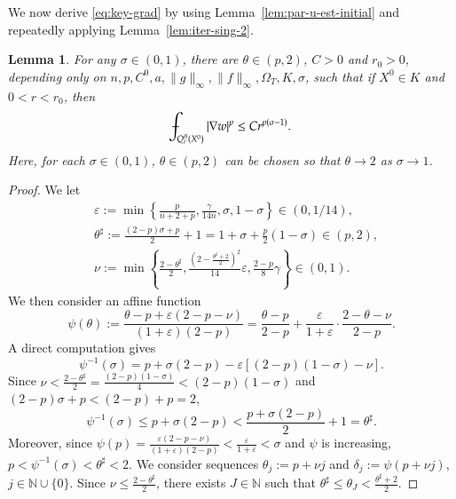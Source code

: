 \documentclass[11pt,oneside,english]{amsart}
\newcommand{\e}{\varepsilon}
\newcommand{\de}{\delta}
\newcommand{\D}{\nabla}
\numberwithin{equation}{section}
\def\Xint#1{\mathchoice
  {\XXint\displaystyle\textstyle{#1}}%
  {\XXint\textstyle\scriptstyle{#1}}%
  {\XXint\scriptstyle\scriptscriptstyle{#1}}%
  {\XXint\scriptscriptstyle\scriptscriptstyle{#1}}%
  \!\int}
\def\XXint#1#2#3{{\setbox0=\hbox{$#1{#2#3}{\int}$}
    \vcenter{\hbox{$#2#3$}}\kern-.5\wd0}}
\def\dashint{\Xint-}
\theoremstyle{plain}
\newtheorem{lemma}{Lemma}
\numberwithin{equation}{section}
\begin{document}
We now derive \eqref{eq:key-grad} by using Lemma~\ref{lem:par-u-est-initial} and repeatedly applying Lemma~\ref{lem:iter-sing-2}.

\begin{lemma}\label{lem:par-u-v-est}
    For any $\sigma\in (0,1)$, there are $\theta\in(p,2)$, $C>0$ and $r_0>0$, depending only on $n,p,C^0,a,\|g\|_\infty,\|f\|_\infty, \Omega_T,K, \sigma$, such that if $X^0\in K$ and $0<r<r_0$, then
    \begin{align*}
        \dashint_{Q_r^\theta(X^0)}|\D w|^p\le Cr^{p(\sigma-1)}.
    \end{align*}
    Here, for each $\sigma\in(0,1)$, $\theta\in(p,2)$ can be chosen so that $\theta\to2$ as $\sigma\to1$.
\end{lemma}

\begin{proof}
We let
\begin{align*}
&\e:=\min\left\{\frac{p}{n+2+p}, \frac{\gamma}{14n},\sigma, 1-\sigma\right\}\in(0,1/14),\\
&\theta^\sharp:=\frac{(2-p)\sigma+p}2+1=1+\sigma+\frac{p}2(1-\sigma)\in(p,2),\\
&\nu:=\min\left\{\frac{2-\theta^\sharp}2, \frac{\left(2-\frac{\theta^\sharp+2}{2} \right)^2}{14}\e, \frac{2-p}8\gamma \right\}\in(0,1).
\end{align*}
We then consider an affine function
$$
\psi(\theta):=\frac{\theta-p+\e(2-p-\nu) }{(1+\e)(2-p) }=\frac{\theta-p}{2-p}+\frac{\e}{1+\e}\cdot\frac{2-\theta-\nu}{2-p}.
$$
A direct computation gives
$$
\psi^{-1}(\sigma)=p+\sigma(2-p)-\e[(2-p)(1-\sigma)-\nu].
$$
Since $\nu<\frac{2-\theta^\sharp}2=\frac{(2-p)(1-\sigma)}4<(2-p)(1-\sigma)$ and $(2-p)\sigma+p<(2-p)+p=2$,
$$
\psi^{-1}(\sigma)\le p+\sigma(2-p)<\frac{p+\sigma(2-p)}2+1=\theta^\sharp.
$$
Moreover, since $\psi(p)=\frac{\e(2-p-\nu)}{(1+\e)(2-p)}<\frac{\e}{1+\e}<\sigma$ and $\psi$ is increasing, $p<\psi^{-1}(\sigma)<\theta^\sharp<2$. We consider sequences $\theta_j:=p+\nu j$ and $\de_j:=\psi(p+\nu j)$, $j\in \mathbb{N}\cup\{0\}$. Since $\nu\le\frac{2-\theta^\sharp}2$, there exists $J\in \mathbb{N}$ such that $\theta^\sharp\le\theta_J<\frac{\theta^\sharp+2}2$. 


\end{proof}
\end{document}
